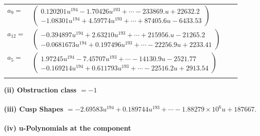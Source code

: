 \documentclass[1p]{elsarticle_modified}
\theoremstyle{definition}
\begin{document}
\begin{tabular}{m{7pt} m{180pt} m{7pt} m{180pt} }
\flushright $a_{9}=$&$\begin{pmatrix}0.120201 u^{194}-1.70426 u^{193}+\cdots-233869. u+22632.2\\-1.08301 u^{194}+4.59774 u^{193}+\cdots+87405.6 u-6433.53\end{pmatrix}$ \\
\flushright $a_{12}=$&$\begin{pmatrix}-0.394897 u^{194}+2.63210 u^{193}+\cdots+215956. u-21265.2\\-0.0681673 u^{194}+0.197496 u^{193}+\cdots-22256.9 u+2233.41\end{pmatrix}$ \\
\flushright $a_{5}=$&$\begin{pmatrix}1.97245 u^{194}-7.45707 u^{193}+\cdots-14130.9 u-2521.77\\-0.169214 u^{194}+0.611793 u^{193}+\cdots-22516.2 u+2913.54\end{pmatrix}$\\&\end{tabular}
\flushleft \textbf{(ii) Obstruction class $= -1$}\\~\\
\flushleft \textbf{(iii) Cusp Shapes $= -2.69583 u^{194}+0.189744 u^{193}+\cdots-1.88279\times10^{6} u+187667.$}\\~\\
\newpage\renewcommand{\arraystretch}{1}
\flushleft \textbf{(iv) u-Polynomials at the component}\newline \\
\end{document}
